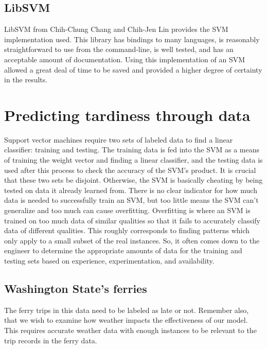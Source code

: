 \documentclass[11pt]{article} %
\begin{document}
\subsection{LibSVM}
\label{sec:libsvm}
LibSVM \cite{chang2011libsvm} from Chih-Chung Chang and Chih-Jen Lin provides the
SVM implementation used.  This library has bindings to many languages, is reasonably
straightforward to use from the command-line, is well tested, and has an acceptable
amount of documentation. Using this implementation of an SVM allowed a great deal
of time to be saved and provided a higher degree of certainty in the results.

\section{Predicting tardiness through data}
\label{sec:problem}
Support vector machines require two sets of labeled data to find a linear classifier:
training and testing. The training data is fed into the SVM as a means of training
the weight vector and finding a linear classifier, and the testing data is used
after this process to check the accuracy of the SVM's product. It is crucial that
these two sets be disjoint. Otherwise, the SVM is basically cheating by being
tested on data it already learned from. There is no clear indicator for how much data
is needed to successfully train an SVM, but too little means the SVM can't 
generalize and too much can cause overfitting. Overfitting is where an SVM is
trained on too much data of similar qualities so that it fails to accurately
classify data of different qualities. This roughly corresponds to finding patterns
which only apply to a small subset of the real instances.  So, it often comes
down to the engineer to determine the appropriate amounts of data for the training
and testing sets based on experience, experimentation, and availability.



\subsection{Washington State's ferries}
\label{sec:wsdot}

The ferry trips in this data 
need to be labeled as late or not. Remember also, that we wish to examine how
weather impacts the effectiveness of our model.  This requires accurate weather
data with enough instances to be relevant to the trip records in the ferry data.
\end{document}
